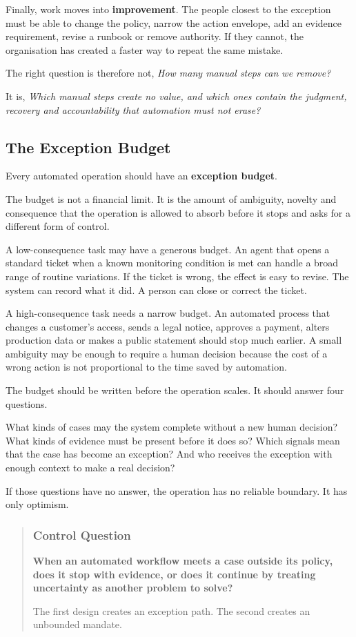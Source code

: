 Finally, work moves into \textbf{improvement}. The people closest to the
exception must be able to change the policy, narrow the action envelope,
add an evidence requirement, revise a runbook or remove authority. If
they cannot, the organisation has created a faster way to repeat the
same mistake.

The right question is therefore not, \emph{How many manual steps can we
remove?}

It is, \emph{Which manual steps create no value, and which ones contain
the judgment, recovery and accountability that automation must not
erase?}

\subsection{The Exception Budget}\label{the-exception-budget}

Every automated operation should have an \textbf{exception budget}.

The budget is not a financial limit. It is the amount of ambiguity,
novelty and consequence that the operation is allowed to absorb before
it stops and asks for a different form of control.

A low-consequence task may have a generous budget. An agent that opens a
standard ticket when a known monitoring condition is met can handle a
broad range of routine variations. If the ticket is wrong, the effect is
easy to revise. The system can record what it did. A person can close or
correct the ticket.

A high-consequence task needs a narrow budget. An automated process that
changes a customer's access, sends a legal notice, approves a payment,
alters production data or makes a public statement should stop much
earlier. A small ambiguity may be enough to require a human decision
because the cost of a wrong action is not proportional to the time saved
by automation.

The budget should be written before the operation scales. It should
answer four questions.

What kinds of cases may the system complete without a new human
decision? What kinds of evidence must be present before it does so?
Which signals mean that the case has become an exception? And who
receives the exception with enough context to make a real decision?

If those questions have no answer, the operation has no reliable
boundary. It has only optimism.

\begin{quote}
\subsubsection{Control Question}\label{control-question}

\textbf{When an automated workflow meets a case outside its policy, does
it stop with evidence, or does it continue by treating uncertainty as
another problem to solve?}

The first design creates an exception path. The second creates an
unbounded mandate.
\end{quote}

